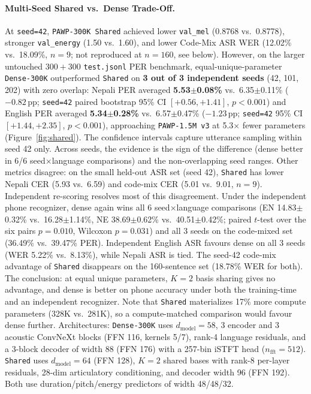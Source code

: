 \paragraph{Multi-Seed Shared vs.\ Dense Trade-Off.}
At \texttt{seed=42}, \texttt{PAWP-300K Shared} achieved lower \texttt{val\_mel} (0.8768 vs.\ 0.8778), stronger \texttt{val\_energy} (1.50 vs.\ 1.60), and lower Code-Mix ASR WER (12.02\% vs.\ 18.09\%, $n=9$; not reproduced at $n=160$, see below). However, on the larger untouched $300+300$ \texttt{test.jsonl} PER benchmark, equal-unique-parameter \texttt{Dense-300K} outperformed \texttt{Shared} on \textbf{3 out of 3 independent seeds} (42, 101, 202) with zero overlap: Nepali PER averaged \textbf{5.53$\pm$0.08\%} vs.\ 6.35$\pm$0.11\% ($-0.82$\,pp; \texttt{seed=42} paired bootstrap 95\% CI $[+0.56, +1.41]$, $p<0.001$) and English PER averaged \textbf{5.34$\pm$0.28\%} vs.\ 6.57$\pm$0.47\% ($-1.23$\,pp; \texttt{seed=42} 95\% CI $[+1.44, +2.35]$, $p<0.001$), approaching \texttt{PAWP-1.5M v3} at 5.3$\times$ fewer parameters (Figure~\ref{fig:shared}). The confidence intervals capture utterance sampling within seed 42 only. Across seeds, the evidence is the sign of the difference (dense better in 6/6 seed$\times$language comparisons) and the non-overlapping seed ranges. Other metrics disagree: on the small held-out ASR set (seed 42), \texttt{Shared} has lower Nepali CER (5.93 vs.\ 6.59) and code-mix CER (5.01 vs.\ 9.01, $n=9$). Independent re-scoring resolves most of this disagreement. Under the independent phone recognizer, dense again wins all 6 seed$\times$language comparisons (EN 14.83$\pm$0.32\% vs.\ 16.28$\pm$1.14\%, NE 38.69$\pm$0.62\% vs.\ 40.51$\pm$0.42\%; paired $t$-test over the six pairs $p=0.010$, Wilcoxon $p=0.031$) and all 3 seeds on the code-mixed set (36.49\% vs.\ 39.47\% PER). Independent English ASR favours dense on all 3 seeds (WER 5.22\% vs.\ 8.13\%), while Nepali ASR is tied. The seed-42 code-mix advantage of \texttt{Shared} disappears on the 160-sentence set (18.78\% WER for both). The conclusion: at equal unique parameters, $K=2$ basis sharing gives no advantage, and dense is better on phone accuracy under both the training-time and an independent recognizer. Note that \texttt{Shared} materializes 17\% more compute parameters (328K vs.\ 281K), so a compute-matched comparison would favour dense further. Architectures: \texttt{Dense-300K} uses $d_{\text{model}}=58$, 3 encoder and 3 acoustic ConvNeXt blocks (FFN 116, kernels 5/7), rank-4 language residuals, and a 3-block decoder of width 88 (FFN 176) with a 257-bin iSTFT head ($n_{\text{fft}}=512$). \texttt{Shared} uses $d_{\text{model}}=64$ (FFN 128), $K=2$ shared bases with rank-8 per-layer residuals, 28-dim articulatory conditioning, and decoder width 96 (FFN 192). Both use duration/pitch/energy predictors of width 48/48/32.

